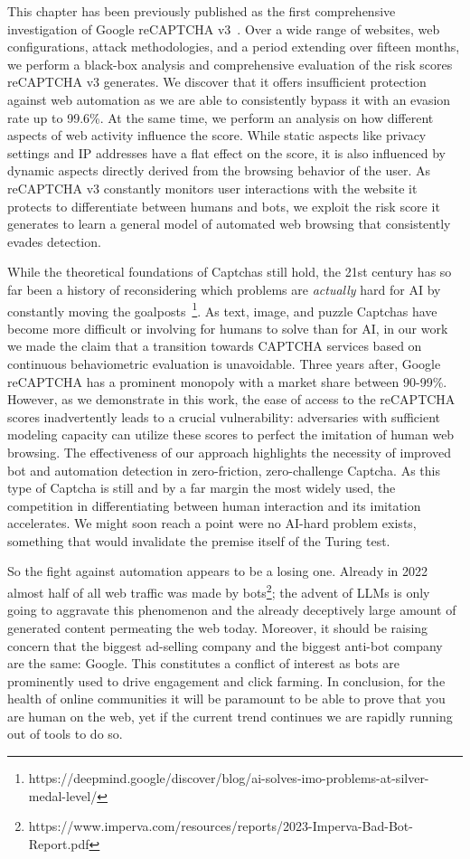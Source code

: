 This chapter has been previously published as the first comprehensive investigation of Google reCAPTCHA v3~\cite{tsingenopoulos2022captcha}.
Over a wide range of websites, web configurations, attack methodologies, and a period extending over fifteen months, we perform a black-box analysis and comprehensive evaluation of the risk scores reCAPTCHA v3 generates.
We discover that it offers insufficient protection against web automation as we are able to consistently bypass it with an evasion rate up to 99.6\%.
At the same time, we perform an analysis on how different aspects of web activity influence the score.
While static aspects like privacy settings and IP addresses have a flat effect on the score, it is also influenced by dynamic aspects directly derived from the browsing behavior of the user.
As reCAPTCHA v3 constantly monitors user interactions with the website it protects to differentiate between humans and bots, we exploit the risk score it generates to learn a general model of automated web browsing that consistently evades detection.

While the theoretical foundations of Captchas still hold, the 21st century has so far been a history of reconsidering which problems are \textit{actually} hard for AI by constantly moving the goalposts~\footnote{https://deepmind.google/discover/blog/ai-solves-imo-problems-at-silver-medal-level/}.
As text, image, and puzzle Captchas have become more difficult or involving for humans to solve than for AI, in our work we made the claim that a transition towards CAPTCHA services based on continuous behaviometric evaluation is unavoidable.
Three years after, Google reCAPTCHA has a prominent monopoly with a market share between 90-99\%.
However, as we demonstrate in this work, the ease of access to the reCAPTCHA scores inadvertently leads to a crucial vulnerability: adversaries with sufficient modeling capacity can utilize these scores to perfect the imitation of human web browsing.
The effectiveness of our approach highlights the necessity of improved bot and automation detection in zero-friction, zero-challenge Captcha.
As this type of Captcha is still and by a far margin the most widely used, the competition in differentiating between human interaction and its imitation accelerates.
We might soon reach a point were no AI-hard problem exists, something that would invalidate the premise itself of the Turing test.

So the fight against automation appears to be a losing one.
Already in 2022 almost half of all web traffic was made by bots\footnote{https://www.imperva.com/resources/reports/2023-Imperva-Bad-Bot-Report.pdf}; the advent of LLMs is only going to aggravate this phenomenon and the already deceptively large amount of generated content permeating the web today.
Moreover, it should be raising concern that the biggest ad-selling company and the biggest anti-bot company are the same: Google.
This constitutes a conflict of interest as bots are prominently used to drive engagement and click farming.
In conclusion, for the health of online communities it will be paramount to be able to prove that you are human on the web, yet if the current trend continues we are rapidly running out of tools to do so.


